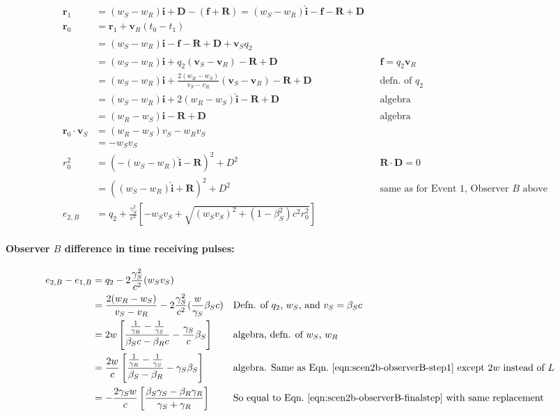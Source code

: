 \documentclass[a4paper]{article}
\theoremstyle{plain}
\theoremstyle{definition}
\newcommand{\vect}[1]{\mathbf{#1}}
\newcommand{\hatvec}[1]{\hat{\mathbf{#1}}}
\begin{document}
\begin{align*}
\vect{r}_1 & = (w_S - w_R)\hatvec{i} + \vect{D} - (\vect{f} + \vect{R}) = (w_S - w_R)\hatvec{i} - \vect{f} - \vect{R} + \vect{D} \\
\vect{r}_0
  & = \vect{r}_1 + \vect{v}_R (t_0 - t_1) \\
  & = (w_S - w_R)\hatvec{i} - \vect{f} - \vect{R} + \vect{D} + \vect{v}_S q_2 \\
  & = (w_S - w_R)\hatvec{i} + q_2 (\vect{v}_S - \vect{v}_R) - \vect{R} + \vect{D} & & \text{$\vect{f} = q_2 \vect{v}_R$} \\
  & = (w_S - w_R)\hatvec{i} + \frac{2(w_R - w_S)}{v_S - v_R} (\vect{v}_S - \vect{v}_R) - \vect{R} + \vect{D} & & \text{defn. of $q_2$} \\
  & = (w_S - w_R)\hatvec{i} + 2(w_R - w_S) \hatvec{i} - \vect{R} + \vect{D} & & \text{algebra} \\
  & = (w_R - w_S) \hatvec{i} - \vect{R} + \vect{D} & & \text{algebra} \\
\vect{r}_0 \cdot \vect{v}_S
  & = (w_R - w_S)v_S - w_Rv_S \\
  & = - w_Sv_S \\
r_0^2
  & = (-(w_S-w_R)\hatvec{i} - \vect{R})^2 + D^2 & & \text{$\vect{R} \cdot \vect{D} = 0$} \\
  & = ((w_S-w_R)\hatvec{i} + \vect{R})^2 + D^2 & & \text{same as for Event 1, Observer $B$ above} \\
e_{2,B} & = q_2 + \frac{\gamma_S^2}{c^2} \left[ -w_Sv_S + \sqrt{ (w_Sv_S)^2 + (1-\beta_S^2)c^2r_0^2 } \right]
\end{align*}


\paragraph{Observer $B$ difference in time receiving pulses:}

\begin{align*}
e_{2,B} - e_{1,B}
  & = q_2 - 2\frac{\gamma_S^2}{c^2} (w_S v_S) \\
  & = \frac{2(w_R-w_S)}{v_S - v_R} - 2\frac{\gamma_S^2}{c^2} ( \frac{w}{\gamma_S} \beta_S c ) & & \text{Defn. of $q_2$, $w_S$, and $v_S = \beta_S c$} \\
  & = 2w \left[ \frac{\frac{1}{\gamma_R} - \frac{1}{\gamma_S}}{\beta_S c - \beta_R c} - \frac{\gamma_S}{c} \beta_S \right] & & \text{algebra, defn. of $w_S$, $w_R$} \\
  & = \frac{2w}{c} \left[ \frac{\frac{1}{\gamma_R} - \frac{1}{\gamma_S}}{\beta_S-\beta_R} - \gamma_S \beta_S \right] & & \text{algebra. Same as Eqn.~\eqref{eqn:scen2b-observerB-step1} except $2w$ instead of $L$} \\
  & = -\frac{2\gamma_S w}{c} \left[ \frac{\beta_S\gamma_S - \beta_R\gamma_R}{\gamma_S + \gamma_R} \right] & & \text{So equal to Eqn.~\eqref{eqn:scen2b-observerB-finalstep} with same replacement}
\end{align*}
\end{document}
